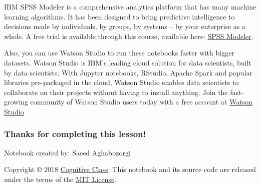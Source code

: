 \documentclass[11pt]{article}
\begin{document}
IBM SPSS Modeler is a comprehensive analytics platform that has many
machine learning algorithms. It has been designed to bring predictive
intelligence to decisions made by individuals, by groups, by systems --
by your enterprise as a whole. A free trial is available through this
course, available here: \href{http://cocl.us/ML0101EN-SPSSModeler}{SPSS
Modeler}.

Also, you can use Watson Studio to run these notebooks faster with
bigger datasets. Watson Studio is IBM's leading cloud solution for data
scientists, built by data scientists. With Jupyter notebooks, RStudio,
Apache Spark and popular libraries pre-packaged in the cloud, Watson
Studio enables data scientists to collaborate on their projects without
having to install anything. Join the fast-growing community of Watson
Studio users today with a free account at
\href{https://cocl.us/ML0101EN_DSX}{Watson Studio}

\hypertarget{thanks-for-completing-this-lesson}{%
\subsubsection{Thanks for completing this
lesson!}\label{thanks-for-completing-this-lesson}}

Notebook created by: Saeed Aghabozorgi

Copyright © 2018 \href{https://cocl.us/DX0108EN_CC}{Cognitive Class}.
This notebook and its source code are released under the terms of the
\href{https://bigdatauniversity.com/mit-license/}{MIT License}.​


    
    
    
    
\end{document}
